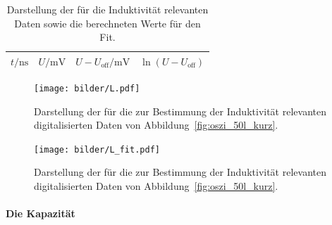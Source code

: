\begin{table}[htpb]
  \centering
  \begin{tabular}{cccc}
    \midrule
    \midrule
    $t / \si{\nano\second}$ & $U / \si{\milli\volt}$ &
    $U - U_\text{off} / \si{\milli\volt}$ & $\ln(U - U_\text{off})$ \\
    \midrule
    
    \midrule
    \midrule
  \end{tabular}
  \caption{Darstellung der für die Induktivität relevanten Daten sowie
  die berechneten Werte für den Fit.}
  \label{tab:L_Daten}
\end{table}
\begin{figure}[htpb]
  \centering
  \texttt{[image: bilder/L.pdf]}
  \caption{Darstellung der für die zur Bestimmung der Induktivität
    relevanten digitalisierten Daten von Abbildung~\ref{fig:oszi_50l_kurz}.}
  \label{fig:induktivitaetsbelag}
  \texttt{[image: bilder/L\_fit.pdf]}
  \caption{Darstellung der für die zur Bestimmung der Induktivität
    relevanten digitalisierten Daten von Abbildung~\ref{fig:oszi_50l_kurz}.}
  \label{fig:induktivitaetsbelag_fit}
\end{figure}

\clearpage
\paragraph{Die Kapazität}
\label{par:die_kapazitaet}

